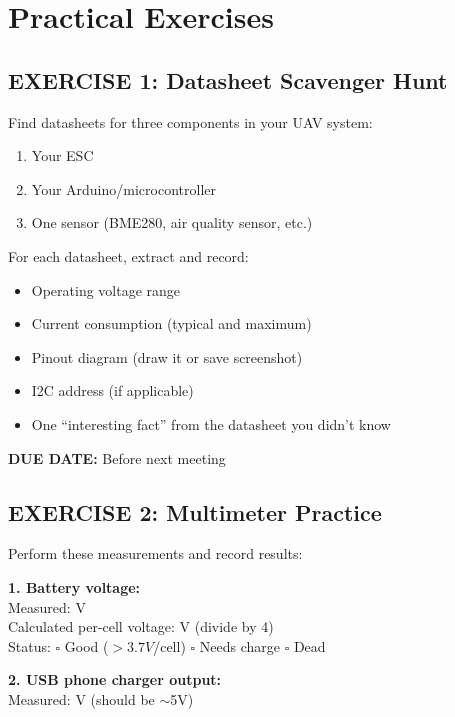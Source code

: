 \documentclass[11pt,letterpaper]{article}
\begin{document}
\newpage
\section{Practical Exercises}

\subsection*{EXERCISE 1: Datasheet Scavenger Hunt}

Find datasheets for three components in your UAV system:
\begin{enumerate}
\item Your ESC
\item Your Arduino/microcontroller
\item One sensor (BME280, air quality sensor, etc.)
\end{enumerate}

For each datasheet, extract and record:
\begin{itemize}
\item Operating voltage range
\item Current consumption (typical and maximum)
\item Pinout diagram (draw it or save screenshot)
\item I2C address (if applicable)
\item One ``interesting fact'' from the datasheet you didn't know
\end{itemize}

\textbf{DUE DATE:} Before next meeting

\subsection*{EXERCISE 2: Multimeter Practice}

Perform these measurements and record results:

\textbf{1. Battery voltage:}\\
Measured: \underline{\hspace{3cm}} V\\
Calculated per-cell voltage: \underline{\hspace{3cm}} V (divide by 4)\\
Status: $\square$ Good ($>3.7V$/cell) \quad $\square$ Needs charge \quad $\square$ Dead

\textbf{2. USB phone charger output:}\\
Measured: \underline{\hspace{3cm}} V (should be $\sim$5V)
\end{document}
